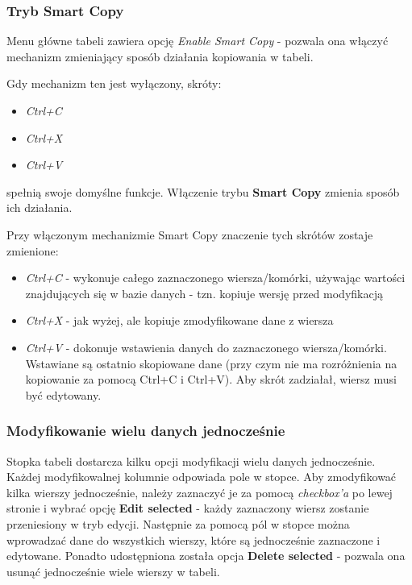 \documentclass[12pt] {article}
\begin{document}
\subsubsection{Tryb Smart Copy}
Menu główne tabeli zawiera opcję \emph{Enable Smart Copy} - pozwala ona włączyć mechanizm zmieniający sposób działania kopiowania w tabeli. 

Gdy mechanizm ten jest wyłączony, skróty:
\begin{itemize}
\item \emph{Ctrl+C}
\item \emph{Ctrl+X}
\item \emph{Ctrl+V}
\end{itemize}
spełnią swoje domyślne funkcje. Włączenie trybu \textbf{Smart Copy} zmienia sposób ich działania.

Przy włączonym mechanizmie Smart Copy znaczenie tych skrótów zostaje zmienione:
\begin{itemize}
\item \emph{Ctrl+C} - wykonuje całego zaznaczonego wiersza/komórki, używając wartości znajdujących się w bazie danych - tzn. kopiuje wersję przed modyfikacją
\item \emph{Ctrl+X} - jak wyżej, ale kopiuje zmodyfikowane dane z wiersza
\item \emph{Ctrl+V} - dokonuje wstawienia danych do zaznaczonego wiersza/komórki. Wstawiane są ostatnio skopiowane dane (przy czym nie ma rozróżnienia na kopiowanie za pomocą Ctrl+C i Ctrl+V). Aby skrót zadziałał, wiersz musi być edytowany.
\end{itemize} 

\subsubsection{Modyfikowanie wielu danych jednocześnie}
Stopka tabeli dostarcza kilku opcji modyfikacji wielu danych jednocześnie. Każdej modyfikowalnej kolumnie odpowiada pole w stopce. Aby zmodyfikować kilka wierszy jednocześnie, należy zaznaczyć je za pomocą \emph{checkbox'a} po lewej stronie i wybrać opcję \textbf{Edit selected} - każdy zaznaczony wiersz zostanie przeniesiony w tryb edycji. Następnie za pomocą pól w stopce można wprowadzać dane do wszystkich wierszy, które są jednocześnie zaznaczone i edytowane. Ponadto udostępniona została opcja \textbf{Delete selected} - pozwala ona usunąć jednocześnie wiele wierszy w tabeli. 
\end{document}
